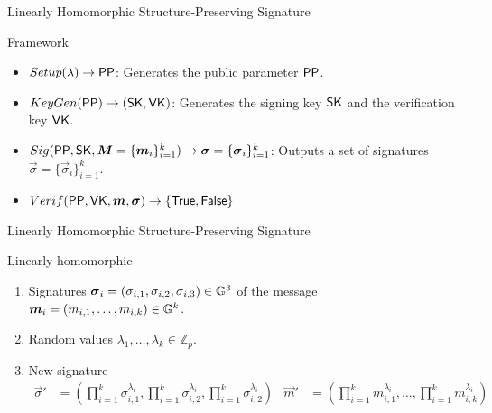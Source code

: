 \begin{frame}{Linearly Homomorphic Structure-Preserving Signature}
  \begin{block}{Framework}
  \begin{itemize}
  \item $Setup(\lambda) \to \mathsf{PP}$: Generates the public parameter $\mathsf{PP}$.
  \item $KeyGen(\mathsf{PP}) \to (\mathsf{SK}, \mathsf{VK})$: Generates the signing key $\mathsf{SK}$ and the verification key $\mathsf{VK}$.
  \item $Sig(\mathsf{PP}, \mathsf{SK}, \boldsymbol{M} = \{\boldsymbol{m}_i\}_{i=1}^k) \to \boldsymbol{\sigma} = \{\boldsymbol{\sigma}_i\}_{i=1}^k$: Outputs a set of signatures $\vec{\sigma} = \{\vec{\sigma}_i\}_{i=1}^k$.
  \item $Verif(\mathsf{PP}, \mathsf{VK}, \boldsymbol{m}, \boldsymbol{\sigma}) \to \{\mathsf{True}, \mathsf{False}\}$
  \end{itemize}
  \end{block}
\end{frame}

\begin{frame}{Linearly Homomorphic Structure-Preserving Signature}
  \begin{block}{Linearly homomorphic}
    \begin{enumerate}
    \item Signatures $\boldsymbol{\sigma}_i = (\sigma_{i,1}, \sigma_{i,2}, \sigma_{i,3}) \in \mathbb{G}^3$ of the message $\boldsymbol{m}_i = (m_{i,1}, \dots, m_{i,k}) \in \mathbb{G}^k$.
    \item Random values $\lambda_1, \dots, \lambda_k \in \mathbb{Z}_p$.
    \item New signature
      \begin{align*}
        \vec{\sigma}' &= (\prod_{i = 1}^k \sigma_{i,1}^{\lambda_i}, \prod_{i = 1}^k \sigma_{i,2}^{\lambda_i}, \prod_{i = 1}^k \sigma_{i,2}^{\lambda_i}) & \vec{m}' &= (\prod_{i = 1}^km_{i,1}^{\lambda_i}, \dots, \prod_{i = 1}^km_{i,k}^{\lambda_i})
      \end{align*}
    \end{enumerate}
  \end{block}
\end{frame}


